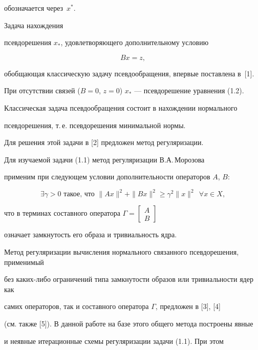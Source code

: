 обозначается через~$x^*$.





Задача нахождения 


псевдорешения $x_*$, удовлетворяющего дополнительному условию


\begin{equation}


Bx=z,


\end{equation}


обобщающая классическую задачу псевдообращения, впервые поставлена в~[1].





При отсутствии связей ($B=0$, $z=0$) $x_*$ --- псевдорешение уравнения (1.2). 


Классическая задача псевдообращения состоит в нахождении нормального 


псевдорешения, т.\,е. псевдорешения минимальной нормы.


Для решения этой задачи в [2] предложен метод регуляризации. 


Для изучаемой задачи (1.1) метод регуляризации В.А.\,Морозова 


применим при следующем условии дополнительности операторов $A$, $B$:


$$


\exists \gamma >0 \text{ такое, что } \|Ax\|^2+\|Bx\|^2 \ge \gamma^2\|x\|^2


\ \ \forall x \in X,


$$


что в терминах составного оператора $\Gamma=\begin{bmatrix}A\\ B\end{bmatrix}$


означает замкнутость его образа и тривиальность ядра.





Метод регуляризации вычисления нормального связанного псевдорешения, применимый 


без каких-либо ограничений типа замкнутости образов или тривиальности ядер как 


самих операторов, так и составного оператора $\Gamma$, предложен в [3], [4] 


(см. также [5]). В данной работе на базе этого общего метода построены явные 


и неявные итерационные схемы регуляризации задачи (1.1). При этом 


